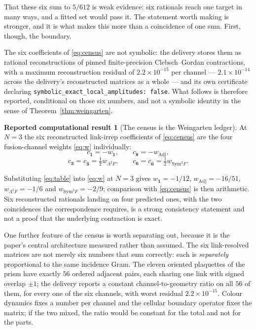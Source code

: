 \documentclass[11pt]{article}
\theoremstyle{plain}
\theoremstyle{definition}
\newtheorem{reported}[theorem]{Reported computational result}
\theoremstyle{remark}
\newcommand{\chk}[1]{}
\begin{document}
That these six sum to $5/612$ is weak evidence: six rationals reach one target
in many ways, and a fitted set would pass it. The statement worth making is
stronger, and it is what makes this more than a coincidence of one sum. First,
though, the boundary.

The six coefficients of \eqref{eq:census} are not symbolic: the delivery
stores them as rational reconstructions of pinned finite-precision
Clebsch--Gordan contractions, with a maximum reconstruction residual of
$2.2\times10^{-15}$ per channel --- $2.1\times10^{-14}$ across the delivery's
reconstructed matrices as a whole --- and its own certificate declaring
\texttt{symbolic\_exact\_local\_amplitudes: false}. What follows is therefore
reported, conditional on those six numbers, and not a symbolic identity in the
sense of Theorem~\ref{thm:weingarten}.

\begin{reported}[The census is the Weingarten ledger]\label{rep:census}
At $N=3$ the six reconstructed link-irrep coefficients of \eqref{eq:census}
are the four fusion-channel weights \eqref{eq:w} individually:
\[
  c_{\mathbf 1}=-w_{\mathbf 1},\qquad
  c_{\mathbf 8}=-w_{\mathrm{Adj}},
\]
\[
  c_{\mathbf 3}=c_{\bar{\mathbf 3}}=\tfrac12 w_{\Lambda^2F},\qquad
  c_{\mathbf 6}=c_{\bar{\mathbf 6}}=\tfrac12 w_{\mathrm{Sym}^2F}.
\]
\end{reported}

\noindent Substituting \eqref{eq:table} into \eqref{eq:w} at $N=3$ gives
$w_{\mathbf 1}=-1/12$, $w_{\mathrm{Adj}}=-16/51$, $w_{\Lambda^2F}=-1/6$ and
$w_{\mathrm{Sym}^2F}=-2/9$; comparison with \eqref{eq:census} is then
arithmetic. Six reconstructed rationals landing on four predicted ones, with
the two coincidences the correspondence requires, is a strong consistency
statement and not a proof that the underlying contraction is exact.
\chk{the B=6 six-channel census IS the Weingarten four-channel ledger, channel by channel}

One further feature of the census is worth separating out, because it is the
paper's central architecture measured rather than assumed. The six
link-resolved matrices are not merely six numbers that sum correctly: each is
\emph{separately} proportional to the same incidence Gram. The eleven oriented
plaquettes of the prism have exactly $56$ ordered adjacent pairs, each sharing
one link with signed overlap $\pm1$; the delivery reports a constant
channel-to-geometry ratio on all $56$ of them, for every one of the six
channels, with worst residual $2.2\times10^{-15}$. Colour dynamics fixes a
number per channel and the cellular boundary operator fixes the matrix; if the
two mixed, the ratio would be constant for the total and not for the parts.
\chk{every shared-link channel is separately proportional to the geometry, on all 56 pairs}
\end{document}
